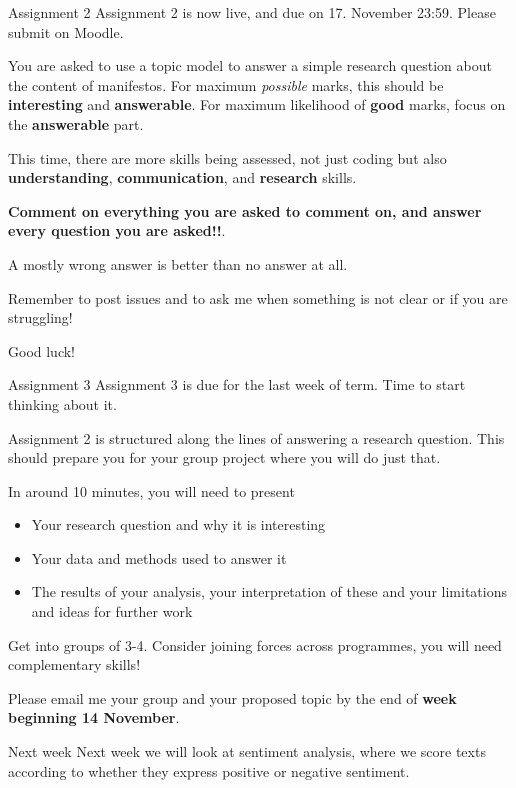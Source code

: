 \documentclass[
  10pt,
  ignorenonframetext,
  aspectratio=169]{beamer}
\newif\ifbibliography
\providecommand{\tightlist}{%
  \setlength{\itemsep}{0pt}\setlength{\parskip}{0pt}}
\begin{document}
\begin{frame}{Assignment 2}
\protect\hypertarget{assignment-2}{}
Assignment 2 is now live, and due on 17. November 23:59. Please submit
on Moodle.

You are asked to use a topic model to answer a simple research question
about the content of manifestos. For maximum \emph{possible} marks, this
should be \textbf{interesting} and \textbf{answerable}. For maximum
likelihood of \textbf{good} marks, focus on the \textbf{answerable}
part.

This time, there are more skills being assessed, not just coding but
also \textbf{understanding}, \textbf{communication}, and
\textbf{research} skills.

\textbf{Comment on everything you are asked to comment on, and answer
every question you are asked!!}.

A mostly wrong answer is better than no answer at all.

Remember to post issues and to ask me when something is not clear or if
you are struggling!

Good luck!
\end{frame}

\begin{frame}{Assignment 3}
\protect\hypertarget{assignment-3}{}
Assignment 3 is due for the last week of term. Time to start thinking
about it.

Assignment 2 is structured along the lines of answering a research
question. This should prepare you for your group project where you will
do just that.

In around 10 minutes, you will need to present

\begin{itemize}
\tightlist
\item
  Your research question and why it is interesting
\item
  Your data and methods used to answer it
\item
  The results of your analysis, your interpretation of these and your
  limitations and ideas for further work
\end{itemize}

Get into groups of 3-4. Consider joining forces across programmes, you
will need complementary skills!

Please email me your group and your proposed topic by the end of
\textbf{week beginning 14 November}.
\end{frame}

\begin{frame}{Next week}
\protect\hypertarget{next-week}{}
Next week we will look at sentiment analysis, where we score texts
according to whether they express positive or negative sentiment.
\end{frame}

\begin{frame}[allowframebreaks]{}
  \bibliographytrue
  
\end{frame}
\end{document}
